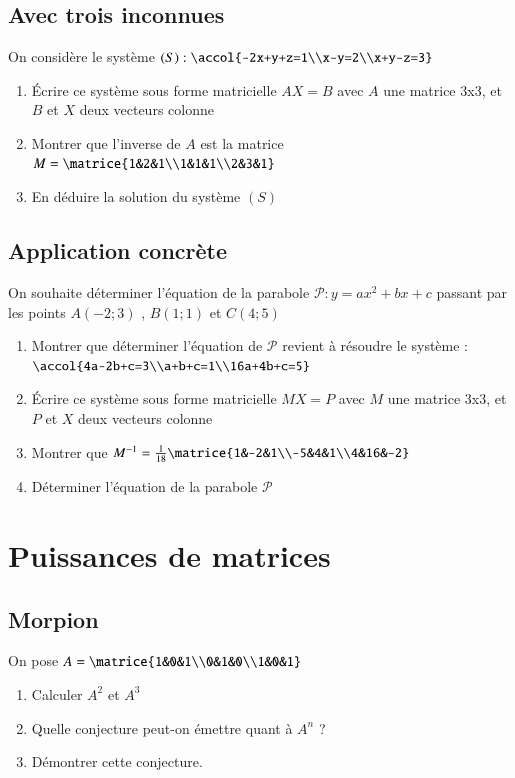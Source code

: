 \documentclass[oneside,12pt]{article}          %
\begin{document}
\subsection{Avec trois inconnues}
On considère le système $(S):\accol{-2x+y+z=1\\x-y=2\\x+y-z=3}$
    \begin{enumerate}
        \item Écrire ce système sous forme matricielle $AX=B$ avec $A$ une matrice 3x3, et $B$ et $X$ deux vecteurs colonne
        \item Montrer que l'inverse de $A$ est la matrice $M=\matrice{1&2&1\\1&1&1\\2&3&1}$
        \item En déduire la solution du système $(S)$
    \end{enumerate}


\subsection{Application concrète}
On souhaite déterminer l'équation de la parabole $\mathscr{P}:y=ax^2+bx+c$ passant par les points $A(-2;3)$ , $B(1;1)$ et $C(4;5)$
    \begin{enumerate}
        \item Montrer que déterminer l'équation de $\mathscr{P}$ revient à résoudre le système : $\accol{4a-2b+c=3\\a+b+c=1\\16a+4b+c=5}$
        \item Écrire ce système sous forme matricielle $MX=P$ avec $M$ une matrice 3x3, et $P$ et $X$ deux vecteurs colonne
        \item Montrer que $M^{-1}=\frac{1}{18}\matrice{1&-2&1\\-5&4&1\\4&16&-2} $
        \item Déterminer l'équation de la parabole $\mathscr{P}$
    \end{enumerate}




\section{Puissances de matrices}

\subsection{Morpion}
On pose $A=\matrice{1&0&1\\0&1&0\\1&0&1} $
    \begin{enumerate}
        \item Calculer $A^2$ et $A^3$
        \item Quelle conjecture peut-on émettre quant à $A^n$ ?
        \item Démontrer cette conjecture.
    \end{enumerate}
\end{document}
